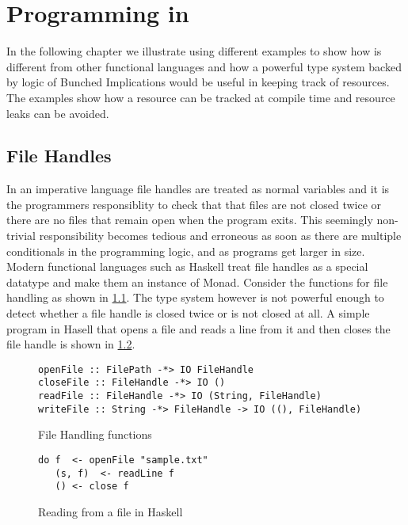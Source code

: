 \chapter{Programming in \qub}
In the following chapter we illustrate using different examples to show how \qub is different
from other functional languages and how a powerful type system backed by logic of Bunched Implications
would be useful in keeping track of resources. The examples show how a resource can be tracked at compile
time and resource leaks can be avoided.

\section{File Handles}\label{sec:file-handle-example}
In an imperative language file handles are treated as normal variables
and it is the programmers responsiblity to check that that files are not closed twice
or there are no files that remain open when the program exits. This seemingly non-trivial
responsibility becomes tedious and erroneous as soon as there are multiple conditionals in the programming
logic, and as programs get larger in size. Modern functional languages such as Haskell treat file handles as
a special datatype and make them an instance of Monad. Consider the functions for file handling
as shown in \cref{fig:file-handling-function}. The type system however is not powerful enough
to detect whether a file handle is closed twice or is not closed at all. A simple program in Hasell that opens a file and reads
a line from it and then closes the file handle is shown in \cref{fig:file-read-close}.

\begin{figure}[h]
  \begin{framed}
    \begin{verbatim}
openFile :: FilePath -*> IO FileHandle
closeFile :: FileHandle -*> IO ()
readFile :: FileHandle -*> IO (String, FileHandle)
writeFile :: String -*> FileHandle -> IO ((), FileHandle)
    \end{verbatim}
  \end{framed}
  \caption{File Handling functions}
  \label{fig:file-handling-function}
\end{figure}

\begin{figure}[h]
  \begin{framed}
    \begin{verbatim}
do f  <- openFile "sample.txt"
   (s, f)  <- readLine f
   () <- close f
    \end{verbatim}
  \end{framed}
  \caption{Reading from a file in Haskell}
  \label{fig:file-read-close}
\end{figure}

